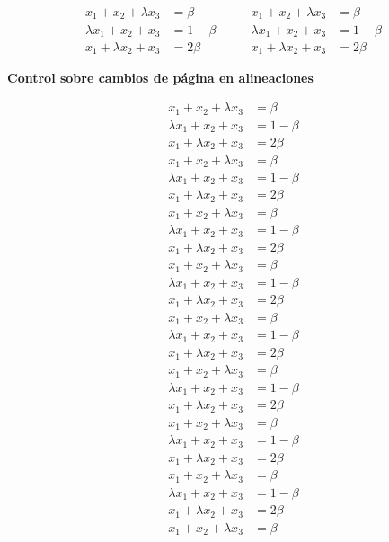 \documentclass[12pt]{book}
\numberwithin{equation}{section}
\theoremstyle{plain}  %
\begin{document}
	\begin{equation*}
	\begin{aligned}
		x_1+x_2+\lambda x_3&=\beta\\
		\lambda x_1+x_2+x_3&=1-\beta\\
		x_1+\lambda x_2+x_3&=2\beta
	\end{aligned}
	\qquad
	\begin{aligned}
		x_1+x_2+\lambda x_3&=\beta\\[0.25cm]
		\lambda x_1+x_2+x_3&=1-\beta\\[0.25cm]
		x_1+\lambda x_2+x_3&=2\beta
	\end{aligned}
\end{equation*}

\noindent\textbf{Control sobre cambios de página en alineaciones}


\begin{align*}
			x_1+x_2+\lambda x_3&=\beta\\
	\lambda x_1+x_2+x_3&=1-\beta\\
	x_1+\lambda x_2+x_3&=2\beta\\
				x_1+x_2+\lambda x_3&=\beta\\
	\lambda x_1+x_2+x_3&=1-\beta\\
	x_1+\lambda x_2+x_3&=2\beta\\
				x_1+x_2+\lambda x_3&=\beta\\
	\lambda x_1+x_2+x_3&=1-\beta\\
	x_1+\lambda x_2+x_3&=2\beta\\
				x_1+x_2+\lambda x_3&=\beta\\
	\lambda x_1+x_2+x_3&=1-\beta\\
	x_1+\lambda x_2+x_3&=2\beta\\			x_1+x_2+\lambda x_3&=\beta\\
	\lambda x_1+x_2+x_3&=1-\beta\\
	x_1+\lambda x_2+x_3&=2\beta\\			x_1+x_2+\lambda x_3&=\beta\\
	\lambda x_1+x_2+x_3&=1-\beta\\
	x_1+\lambda x_2+x_3&=2\beta\\			x_1+x_2+\lambda x_3&=\beta\\
	\lambda x_1+x_2+x_3&=1-\beta\\
	x_1+\lambda x_2+x_3&=2\beta\\			x_1+x_2+\lambda x_3&=\beta\\
	\lambda x_1+x_2+x_3&=1-\beta\\
	x_1+\lambda x_2+x_3&=2\beta\\			x_1+x_2+\lambda x_3&=\beta\\

\end{align*}
\end{document}
